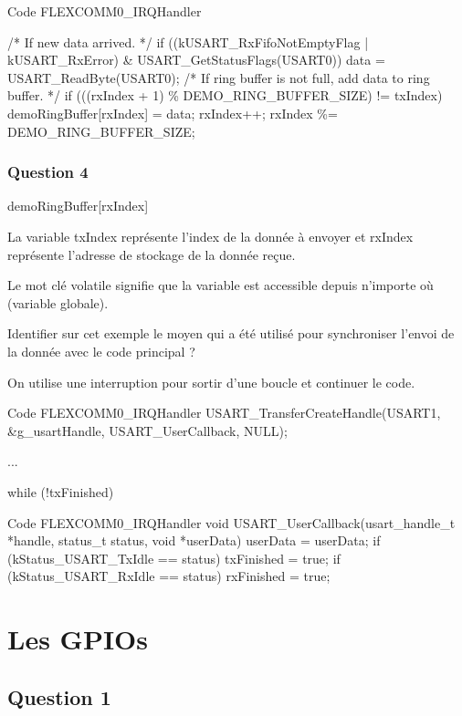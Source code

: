 {\begin{Cpp}{Code FLEXCOMM0\_IRQHandler}
{    /* If new data arrived. */
    if ((kUSART_RxFifoNotEmptyFlag | kUSART_RxError) & USART_GetStatusFlags(USART0)) {
        data = USART_ReadByte(USART0);
        /* If ring buffer is not full, add data to ring buffer. */
        if (((rxIndex + 1) \% DEMO_RING_BUFFER_SIZE) != txIndex) {
            demoRingBuffer[rxIndex] = data;
            rxIndex++;
            rxIndex \%= DEMO_RING_BUFFER_SIZE;
        }
    }

}
\end{Cpp}



\subsection{Question 4}

demoRingBuffer[rxIndex] 

La variable txIndex représente l'index de la donnée à envoyer et rxIndex représente l'adresse de stockage de la donnée reçue.

Le mot clé volatile signifie que la variable est accessible depuis n'importe où (variable globale).


Identifier sur cet exemple le moyen qui a été utilisé pour synchroniser l'envoi de la donnée avec le code principal ?

On utilise une interruption pour sortir d'une boucle et continuer le code.

\begin{Cpp}{Code FLEXCOMM0\_IRQHandler}
USART_TransferCreateHandle(USART1, &g_usartHandle, USART_UserCallback, NULL);

...

while (!txFinished)
{
}
\end{Cpp}

\begin{Cpp}{Code FLEXCOMM0\_IRQHandler}
void USART_UserCallback(usart_handle_t *handle, status_t status, void *userData)
{
    userData = userData;
    if (kStatus_USART_TxIdle == status)
    {
        txFinished = true;
    }
    if (kStatus_USART_RxIdle == status)
    {
        rxFinished = true;
    }
}
\end{Cpp}\chapter{Les GPIOs}

 \section{Question 1}

}
